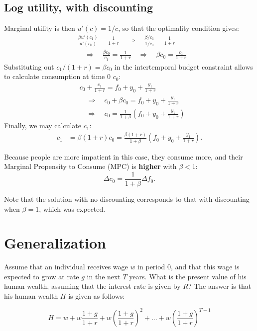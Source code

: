 \documentclass[]{book}
\begin{document}
\subsection{Log utility, with
discounting}\label{log-utility-with-discounting}

Marginal utility is then \(u'(c)=1/c\), so that the optimality condition
gives: \[
\begin{aligned}
& \frac{\beta u'(c_{1})}{u'(c_{0})}=\frac{1}{1+r} \quad \Rightarrow \quad \frac{\beta/c_1}{1/c_0}=\frac{1}{1+r} \\
& \quad \Rightarrow \quad \frac{\beta c_0}{c_1}=\frac{1}{1+r} \quad \Rightarrow \quad \beta c_{0}=\frac{c_{1}}{1+r}
\end{aligned}
\] Substituting out \(c_{1}/(1+r)=\beta c_0\) in the intertemporal
budget constraint allows to calculate consumption at time \(0\) \(c_0\):
\[
\begin{aligned}
&c_{0}+\frac{c_{1}}{1+r}=f_{0}+y_{0}+\frac{y_{1}}{1+r}\\
&\quad \Rightarrow \quad c_{0}+\beta c_0=f_{0}+y_{0}+\frac{y_{1}}{1+r}\\
&\quad \Rightarrow \quad c_{0}=\frac{1}{1+\beta}\left(f_{0}+y_{0}+\frac{y_{1}}{1+r}\right)
\end{aligned}
\] Finally, we may calculate \(c_1\): \[
\begin{aligned}
c_{1}&=\beta (1+r)c_0=\frac{\beta(1+r)}{1+\beta}\left(f_{0}+y_{0}+\frac{y_{1}}{1+r}\right).
\end{aligned}
\]

Because people are more impatient in this case, they consume more, and
their Marginal Propensity to Consume (MPC) is \textbf{higher} with
\(\beta<1\): \[\Delta c_0 = \frac{1}{1+\beta}\Delta f_0.\]

Note that the solution with no discounting corresponds to that with
discounting when \(\beta=1\), which was expected.

\section{Generalization}\label{generalization}

Assume that an individual receives wage \(w\) in period \(0\), and that
this wage is expected to grow at rate \(g\) in the next \(T\) years.
What is the present value of his human wealth, assuming that the
interest rate is given by \(R\)? The answer is that his human wealth
\(H\) is given as follows:

\[H =w+w\frac{1+g}{1+r}+w\left(\frac{1+g}{1+r}\right)^{2}+...+w\left(\frac{1+g}{1+r}\right)^{T-1}\]
\end{document}
